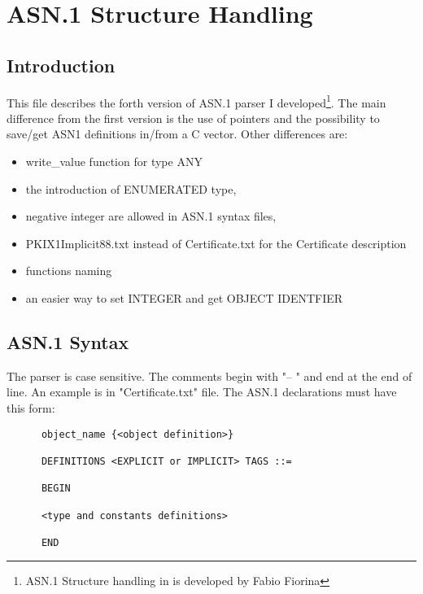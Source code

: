 \chapter{ASN.1 Structure Handling}


\section{Introduction}
 This file describes the forth version of ASN.1 parser I
developed\footnote{ASN.1 Structure handling in \gnutls is developed by Fabio
Fiorina}.
The main difference from the first version is the use of pointers and the
possibility to save/get ASN1 definitions in/from a C vector.
Other differences are:
\begin{itemize}
\item write\_value function for type ANY
\item the introduction of ENUMERATED type,
\item negative integer are allowed in ASN.1 syntax files,
\item PKIX1Implicit88.txt instead of Certificate.txt for the Certificate description
\item functions naming 
\item an easier way to set INTEGER and get OBJECT IDENTFIER  
\end{itemize}


\section{ASN.1 Syntax}
The parser is case sensitive. The comments begin with "-- " and end at the end of line.
An example is in "Certificate.txt" file.
The ASN.1 declarations must have this form:
      
\begin{verbatim}
      object_name {<object definition>}

      DEFINITIONS <EXPLICIT or IMPLICIT> TAGS ::=

      BEGIN 

      <type and constants definitions>

      END
\end{verbatim}

